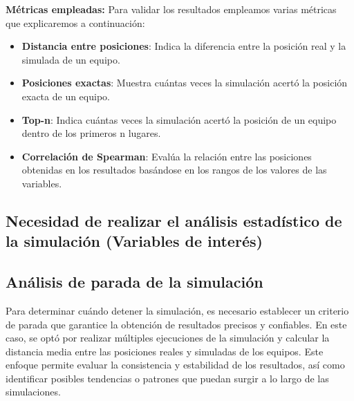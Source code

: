 \documentclass{article}
\begin{document}
            \textbf{Métricas empleadas:}
            Para validar los resultados empleamos varias métricas que explicaremos a continuación:

            \begin{itemize}
                \item \textbf{Distancia entre posiciones}: Indica la diferencia entre la posición real y la simulada de un equipo.
                \item \textbf{Posiciones exactas}: Muestra cuántas veces la simulación acertó la posición exacta de un equipo.
                \item \textbf{Top-n}: Indica cuántas veces la simulación acertó la posición de un equipo dentro de los primeros n lugares.
                \item \textbf{Correlación de Spearman}: Evalúa la relación entre las posiciones obtenidas en los resultados basándose en los rangos de los valores de las variables.                
            \end{itemize}

            
        \subsection{Necesidad de realizar el análisis estadístico de la simulación (Variables de interés)}

        \subsection{Análisis de parada de la simulación}
            Para determinar cuándo detener la simulación, es necesario establecer un criterio de parada que garantice la obtención de resultados precisos y confiables. En este caso, se optó por realizar múltiples ejecuciones de la simulación y calcular la distancia media entre las posiciones reales y simuladas de los equipos. Este enfoque permite evaluar la consistencia y estabilidad de los resultados, así como identificar posibles tendencias o patrones que puedan surgir a lo largo de las simulaciones.
\end{document}
